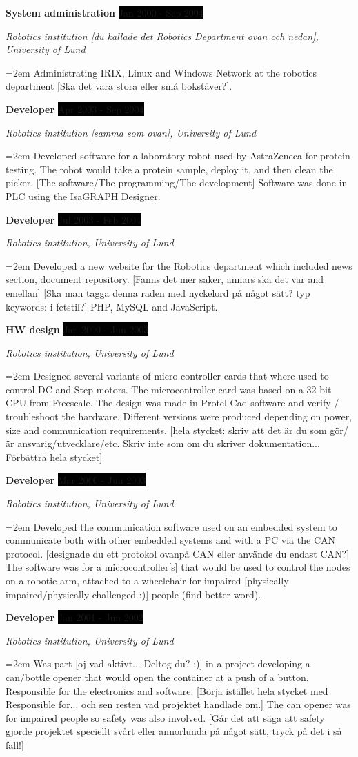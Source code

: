 \documentclass[paper=a4,fontsize=11pt]{scrartcl}
\newcommand{\sepspace}{\vspace*{1em}}
\newcommand{\EducationEntry}[4]{
		\noindent \textbf{#1} \hfill 					%
		\colorbox{Black}{%
			\parbox{6em}{%
			\hfill\color{White}#2}} \par				%
		\noindent \textit{#3} \par					%
		\noindent\hangindent=2em\hangafter=0 \small #4 	%
		\normalsize \par}
\newcommand{\WorkEntry}[4]{						%
		\noindent \textbf{#1} \hfill 					%
		\colorbox{Black}{\color{White}#2} \par		%
		\noindent \textit{#3} \par					%
		\noindent\hangindent=2em\hangafter=0 \small #4 	%
		\normalsize \par}
\begin{document}
\WorkEntry{System administration}{Jan 2000 - Sep 2004}{Robotics institution [du kallade det Robotics Department ovan och nedan], University of Lund}		
  {Administrating IRIX, Linux and Windows Network at the robotics department [Ska det vara stora eller små bokstäver?].}
\sepspace

\WorkEntry{Developer}{Apr 2003 - Sep 2004}{Robotics institution [samma som ovan], University of Lund}		
  {Developed software for a laboratory robot used by AstraZeneca for protein testing. 
  The robot would take a protein sample, deploy it, and then clean the picker. 
  [The software/The programming/The development] Software was done in PLC using the IsaGRAPH Designer.}
\sepspace

\WorkEntry{Developer}{Jul 2003 - Feb 2004}{Robotics institution, University of Lund}		
  {Developed a new website for the Robotics department which included news section, document repository. [Fanns det mer saker, annars ska det var and emellan] 
  [Ska man tagga denna raden med nyckelord på något sätt? typ keywords: i fetstil?] PHP, MySQL and JavaScript.} 
\sepspace

\WorkEntry{HW design}{Jan 2000 - Jun 2003}{Robotics institution, University of Lund}		
{Designed several variants of micro controller cards that where used to control DC and Step motors. The microcontroller card was based on a 32 bit CPU from 
  Freescale. The design was made in Protel Cad software and verify / troubleshoot the hardware. Different versions were produced depending on power, size and communication requirements. [hela stycket: skriv att det är du som gör/är ansvarig/utvecklare/etc. Skriv inte som om du skriver dokumentation... Förbättra hela stycket]
}
\sepspace

\WorkEntry{Developer}{Mar 2000 - Jun 2003}{Robotics institution, University of Lund}		
{Developed the communication software used on an embedded system to communicate both with other  embedded systems and with a PC via the CAN protocol. [designade du ett protokol ovanpå CAN eller använde du endast CAN?]
  The software was for a microcontroller[s] that would be used to control the nodes on a robotic arm, attached to a wheelchair for
impaired [physically impaired/physically challenged :)] people (find better word).} %
\sepspace

\WorkEntry{Developer}{Jan 2001 - Jun 2002}{Robotics institution, University of Lund}		
{Was part [oj vad aktivt... Deltog du? :)] in a project developing a can/bottle opener that would open the container at a push of a button. Responsible for the electronics and software. [Börja istället hela stycket med Responsible for... och sen resten vad projektet handlade om.]
The can opener was for impaired people so safety was also involved. [Går det att säga att safety gjorde projektet speciellt svårt eller annorlunda på något sätt, tryck på det i så fall!]} %
\end{document}
